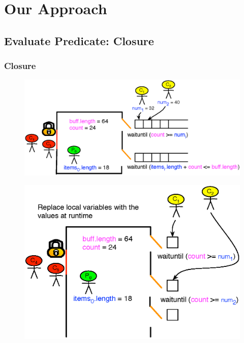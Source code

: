 \documentclass[mathserif,14pt,xcolor=table]{beamer}
\begin{document}
\section{Our Approach}

\subsection{Evaluate Predicate: Closure}
\begin{frame}
    \frametitle{Closure}
     {
        \begin{figure}[ht!]
            \centering
            \includegraphics[scale=0.75]{fig/eval_exp_1.eps}
        \end{figure}
    }
     {
        \begin{figure}[ht!]
            \centering
            \includegraphics[scale=0.75]{fig/eval_exp_2.eps}
        \end{figure}
    }

\end{frame}
\end{document}

